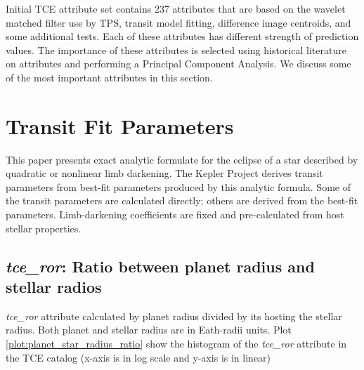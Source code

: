 Initial TCE attribute set contains 237 attributes that are based on the wavelet matched filter use by TPS, transit model fitting, difference image centroids, and some additional tests. Each of these attributes has different strength of prediction values. The importance of these attributes is selected using historical literature on attributes and performing a Principal Component Analysis. We discuss some of the most important attributes in this section.

\section{Transit Fit Parameters}

This paper presents exact analytic formulate for the eclipse of a star described by quadratic or nonlinear limb darkening. The Kepler Project derives transit parameters from best-fit parameters produced by this analytic formula. Some of the transit parameters are calculated directly; others are derived from the best-fit parameters. Limb-darkening coefficients are fixed and pre-calculated from host stellar properties.  


\subsection{\emph{tce\_ror}: Ratio between planet radius and stellar radios}
\emph{tce\_ror} attribute calculated by planet radius divided by its hosting the stellar radius. Both planet and stellar radius are in Eath-radii units. Plot \ref{plot:planet_star_radius_ratio} show the histogram of the \emph{tce\_ror} attribute in the TCE catalog (x-axis is in log scale and y-axis is in linear)


